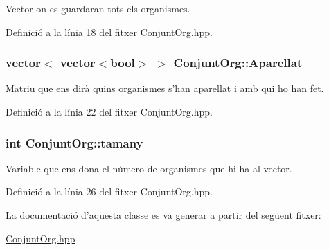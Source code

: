 Vector on es guardaran tots els organismes. 



Definició a la línia 18 del fitxer Conjunt\-Org.\-hpp.

\hypertarget{class_conjunt_org_a9782fdb4c89e8dd61762453de8f77fcb}{
\subsubsection[{Aparellat}]{\setlength{\rightskip}{0pt plus 5cm}vector$<$ vector$<$bool$>$ $>$ Conjunt\-Org\-::\-Aparellat\hspace{0.3cm}{\ttfamily [private]}}}\label{class_conjunt_org_a9782fdb4c89e8dd61762453de8f77fcb}


Matriu que ens dirà quins organismes s'han aparellat i amb qui ho han fet. 



Definició a la línia 22 del fitxer Conjunt\-Org.\-hpp.

\hypertarget{class_conjunt_org_a468e7686498561628ad731ea196df8b5}{
\subsubsection[{tamany}]{\setlength{\rightskip}{0pt plus 5cm}int Conjunt\-Org\-::tamany\hspace{0.3cm}{\ttfamily [private]}}}\label{class_conjunt_org_a468e7686498561628ad731ea196df8b5}


Variable que ens dona el número de organismes que hi ha al vector. 



Definició a la línia 26 del fitxer Conjunt\-Org.\-hpp.



La documentació d'aquesta classe es va generar a partir del següent fitxer\-:\begin{DoxyCompactItemize}
\item 
\hyperlink{_conjunt_org_8hpp}{Conjunt\-Org.\-hpp}\end{DoxyCompactItemize}
